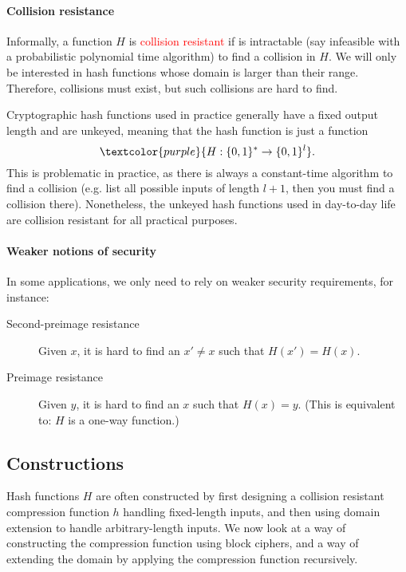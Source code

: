 \documentclass[a4paper, 11pt, openany]{book}
\numberwithin{equation}{section}
\theoremstyle{plain}
\theoremstyle{definition}
\newcommand{\Important}[1]{\textcolor{red}{#1}}
\newcommand{\Define}[1]{\textcolor{purple}{#1}}
\begin{document}
\paragraph{Collision resistance}

Informally, a function $H$ is \Important{collision resistant} if is intractable (say infeasible with a probabilistic polynomial time algorithm) to find a collision in $H$. We will only be interested in hash functions whose domain is larger than their range. Therefore, collisions must exist, but such collisions are hard to find.

Cryptographic hash functions used in practice generally have a fixed output length and are unkeyed, meaning that the hash function is just a function
\[
    \Define{H : \{0,1\}^* \to \{0,1\}^l}.
\]
This is problematic in practice, as there is always a constant-time algorithm to find a collision (e.g. list all possible inputs of length $l+1$, then you must find a collision there). Nonetheless, the unkeyed hash functions used in day-to-day life are collision resistant for all practical purposes.

\paragraph{Weaker notions of security}

In some applications, we only need to rely on weaker security requirements, for instance:
\begin{description}
    \item [Second-preimage resistance] Given $x$, it is hard to find an $x' \ne x$ such that $H(x') = H(x)$.
    
    \item [Preimage resistance] Given $y$, it is hard to find an $x$ such that $H(x) = y$. (This is equivalent to: $H$ is a one-way function.)
\end{description}

\subsection{Constructions}

Hash functions $H$ are often constructed by first designing a collision resistant compression function $h$ handling fixed-length inputs, and then using domain extension to handle arbitrary-length inputs. We now look at a way of constructing the compression function using block ciphers, and a way of extending the domain by applying the compression function recursively.
\end{document}
